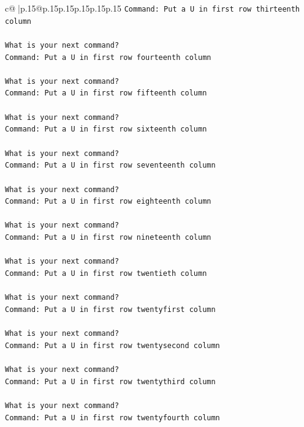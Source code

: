 \documentclass{article}
\begin{document}
{\begin{supertabular}{c@{$\;$}|p{.15\linewidth}@{}p{.15\linewidth}p{.15\linewidth}p{.15\linewidth}p{.15\linewidth}p{.15\linewidth}}
{{{\texttt{Command: Put a U in first row thirteenth column} \\
\\ 
\texttt{What is your next command?} \\
\texttt{Command: Put a U in first row fourteenth column} \\
\\ 
\texttt{What is your next command?} \\
\texttt{Command: Put a U in first row fifteenth column} \\
\\ 
\texttt{What is your next command?} \\
\texttt{Command: Put a U in first row sixteenth column} \\
\\ 
\texttt{What is your next command?} \\
\texttt{Command: Put a U in first row seventeenth column} \\
\\ 
\texttt{What is your next command?} \\
\texttt{Command: Put a U in first row eighteenth column} \\
\\ 
\texttt{What is your next command?} \\
\texttt{Command: Put a U in first row nineteenth column} \\
\\ 
\texttt{What is your next command?} \\
\texttt{Command: Put a U in first row twentieth column} \\
\\ 
\texttt{What is your next command?} \\
\texttt{Command: Put a U in first row twentyfirst column} \\
\\ 
\texttt{What is your next command?} \\
\texttt{Command: Put a U in first row twentysecond column} \\
\\ 
\texttt{What is your next command?} \\
\texttt{Command: Put a U in first row twentythird column} \\
\\ 
\texttt{What is your next command?} \\
\texttt{Command: Put a U in first row twentyfourth column} \\
\\ 
}}}
\end{supertabular}}
\end{document}
